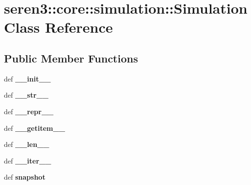 \hypertarget{classseren3_1_1core_1_1simulation_1_1Simulation}{
\section{seren3::core::simulation::Simulation Class Reference}
\label{classseren3_1_1core_1_1simulation_1_1Simulation}
}
\subsection*{Public Member Functions}
\begin{DoxyCompactItemize}
\item 
\hypertarget{classseren3_1_1core_1_1simulation_1_1Simulation_a449207d442719b804c4e9710c3347685}{
def {\bfseries \_\-\_\-init\_\-\_\-}}
\label{classseren3_1_1core_1_1simulation_1_1Simulation_a449207d442719b804c4e9710c3347685}

\item 
\hypertarget{classseren3_1_1core_1_1simulation_1_1Simulation_ac7fb2ab8609e6036ed6fbdefed4dbdff}{
def {\bfseries \_\-\_\-str\_\-\_\-}}
\label{classseren3_1_1core_1_1simulation_1_1Simulation_ac7fb2ab8609e6036ed6fbdefed4dbdff}

\item 
\hypertarget{classseren3_1_1core_1_1simulation_1_1Simulation_abba6851dd18cc81a7d9b90cf1462fbc4}{
def {\bfseries \_\-\_\-repr\_\-\_\-}}
\label{classseren3_1_1core_1_1simulation_1_1Simulation_abba6851dd18cc81a7d9b90cf1462fbc4}

\item 
\hypertarget{classseren3_1_1core_1_1simulation_1_1Simulation_acd99247269e2588346fe987dd3ac3121}{
def {\bfseries \_\-\_\-getitem\_\-\_\-}}
\label{classseren3_1_1core_1_1simulation_1_1Simulation_acd99247269e2588346fe987dd3ac3121}

\item 
\hypertarget{classseren3_1_1core_1_1simulation_1_1Simulation_a3f100a5410e0928cf4d7657e2db273a7}{
def {\bfseries \_\-\_\-len\_\-\_\-}}
\label{classseren3_1_1core_1_1simulation_1_1Simulation_a3f100a5410e0928cf4d7657e2db273a7}

\item 
\hypertarget{classseren3_1_1core_1_1simulation_1_1Simulation_ae7d857afce561fb2c77f8243d3acdffa}{
def {\bfseries \_\-\_\-iter\_\-\_\-}}
\label{classseren3_1_1core_1_1simulation_1_1Simulation_ae7d857afce561fb2c77f8243d3acdffa}

\item 
\hypertarget{classseren3_1_1core_1_1simulation_1_1Simulation_aef90150f655e87d82b20b6eacc49f765}{
def {\bfseries snapshot}}
\label{classseren3_1_1core_1_1simulation_1_1Simulation_aef90150f655e87d82b20b6eacc49f765}


\end{DoxyCompactItemize}
